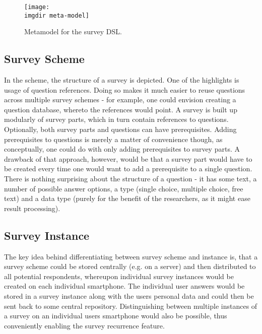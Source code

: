 \begin{figure}[!htbp]
  \texttt{[image: \\imgdir meta-model]}
  \caption{Metamodel for the survey DSL.}
  \label{fig:metamodel}
\end{figure}

\subsection{Survey Scheme}
\label{subsec:surveyscheme}
In the scheme, the structure of a survey is depicted. One of the highlights is usage of question references. Doing so makes it much easier to reuse questions across multiple survey schemes - for example, one could envision creating a question database, whereto the references would point.
A survey is built up modularly of survey parts, which in turn contain references to questions. Optionally, both survey parts and questions can have prerequisites. Adding prerequisites to questions is merely a matter of convenience though, as conceptually, one could do with only adding prerequisites to survey parts. A drawback of that approach, however, would be that a survey part would have to be created every time one would want to add a prerequisite to a single question.
There is nothing surprising about the structure of a question - it has some text, a number of possible answer options, a type (single choice, multiple choice, free text) and a data type (purely for the benefit of the researchers, as it might ease result processing).

\subsection{Survey Instance}
\label{subsec:surveyinstance}
The key idea behind differentiating between survey scheme and instance is, that a survey scheme could be stored centrally (e.g. on a server) and then distributed to all potential respondents, whereupon individual survey instances would be created on each individual smartphone. The individual user answers would be stored in a survey instance along with the users personal data and could then be sent back to some central repository. Distinguishing between multiple instances of a survey on an individual users smartphone would also be possible, thus conveniently enabling the survey recurrence feature.